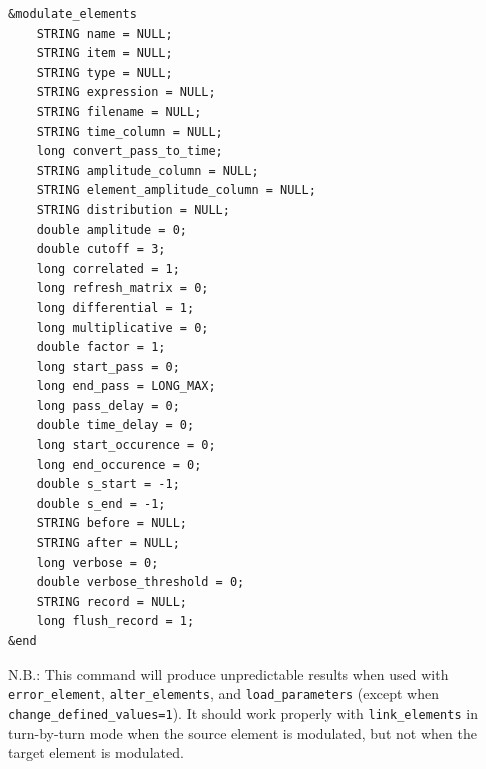 \documentclass[11pt]{article}
\begin{document}
\begin{verbatim}
&modulate_elements
    STRING name = NULL;
    STRING item = NULL;
    STRING type = NULL;
    STRING expression = NULL;
    STRING filename = NULL;
    STRING time_column = NULL;
    long convert_pass_to_time;
    STRING amplitude_column = NULL;
    STRING element_amplitude_column = NULL;
    STRING distribution = NULL;
    double amplitude = 0;
    double cutoff = 3;
    long correlated = 1;
    long refresh_matrix = 0;
    long differential = 1;
    long multiplicative = 0;
    double factor = 1;
    long start_pass = 0;
    long end_pass = LONG_MAX;
    long pass_delay = 0;
    double time_delay = 0;
    long start_occurence = 0;
    long end_occurence = 0;
    double s_start = -1;
    double s_end = -1;
    STRING before = NULL;
    STRING after = NULL;
    long verbose = 0;
    double verbose_threshold = 0;
    STRING record = NULL;
    long flush_record = 1;
&end
\end{verbatim}

N.B.: This command will produce unpredictable results when used with
\verb|error_element|, \verb|alter_elements|, and
\verb|load_parameters| (except when \verb|change_defined_values=1|).
It should work properly with \verb|link_elements| in turn-by-turn mode
when the source element is modulated, but not when the target element
is modulated.
\end{document}
